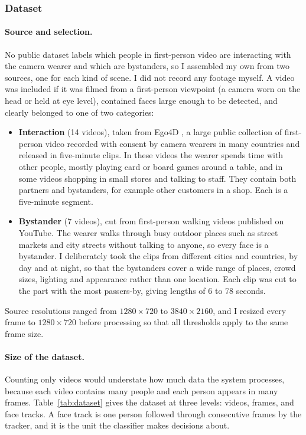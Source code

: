 \subsubsection{Dataset}
\label{sec:dataset}

\paragraph{Source and selection.}
No public dataset labels which people in first-person video are interacting with the
camera wearer and which are bystanders, so I assembled my own from two sources, one for
each kind of scene. I did not record any footage myself. A video was included if it was
filmed from a first-person viewpoint (a camera worn on the head or held at eye level),
contained faces large enough to be detected, and clearly belonged to one of two
categories:
\begin{itemize}
    \item \textbf{Interaction} (14 videos), taken from Ego4D \cite{grauman2022ego4d}, a
        large public collection of first-person video recorded with consent by camera
        wearers in many countries and released in five-minute clips. In these videos the wearer spends time with
        other people, mostly playing card or board games around a table, and in some videos
        shopping in small stores and talking to staff. They contain both partners and
        bystanders, for example other customers in a shop. Each is a five-minute segment.
  \item \textbf{Bystander} (7 videos), cut from first-person walking videos published on
        YouTube. The wearer walks through busy outdoor places such as street markets and
        city streets without talking to anyone, so every face is a bystander. I deliberately
        took the clips from different cities and countries, by day and at night, so that
        the bystanders cover a wide range of places, crowd sizes, lighting and appearance
        rather than one location. Each clip was cut to the part with the most passers-by,
        giving lengths of 6 to 78 seconds.
\end{itemize} Source resolutions ranged from
$1280 \times 720$ to $3840 \times 2160$, and I resized every frame to $1280 \times 720$
before processing so that all thresholds apply to the same frame size.

\paragraph{Size of the dataset.}
Counting only videos would understate how much data the system processes, because each
video contains many people and each person appears in many frames.
Table~\ref{tab:dataset} gives the dataset at three levels: videos, frames, and face
tracks. A face track is one person followed through consecutive frames by the tracker,
and it is the unit the classifier makes decisions about.

